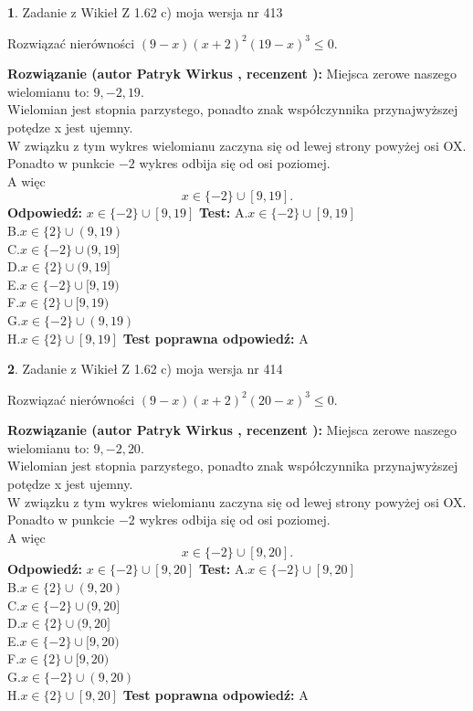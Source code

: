 \documentclass[12pt, a4paper]{article}
\theoremstyle{definition} %
\newtheorem{zad}{}
\newcommand{\zadStart}[1]{\begin{zad}#1\newline}
\newcommand{\zadStop}{\end{zad}}
\newcommand{\rozwStart}[2]{\noindent \textbf{Rozwiązanie (autor #1 , recenzent #2): }\newline}
\newcommand{\rozwStop}{\newline}
\newcommand{\odpStart}{\noindent \textbf{Odpowiedź:}\newline}
\newcommand{\odpStop}{\newline}
\newcommand{\testStart}{\noindent \textbf{Test:}\newline}
\newcommand{\testStop}{\newline}
\newcommand{\kluczStart}{\noindent \textbf{Test poprawna odpowiedź:}\newline}
\newcommand{\kluczStop}{\newline}
\begin{document}
\zadStart{Zadanie z Wikieł Z 1.62 c) moja wersja nr 413}

Rozwiązać nierówności $(9-x)(x+2)^{2}(19-x)^{3}\le0$.
\zadStop
\rozwStart{Patryk Wirkus}{}
Miejsca zerowe naszego wielomianu to: $9, -2, 19$.\\
Wielomian jest stopnia parzystego, ponadto znak współczynnika przy\linebreak najwyższej potędze x jest ujemny.\\ W związku z tym wykres wielomianu zaczyna się od lewej strony powyżej osi OX.\\
Ponadto w punkcie $-2$ wykres odbija się od osi poziomej.\\
A więc $$x \in \{-2\} \cup [9,19].$$
\rozwStop
\odpStart
$x \in \{-2\} \cup [9,19]$
\odpStop
\testStart
A.$x \in \{-2\} \cup [9,19]$\\
B.$x \in \{2\} \cup (9,19)$\\
C.$x \in \{-2\} \cup (9,19]$\\
D.$x \in \{2\} \cup (9,19]$\\
E.$x \in \{-2\} \cup [9,19)$\\
F.$x \in \{2\} \cup [9,19)$\\
G.$x \in \{-2\} \cup (9,19)$\\
H.$x \in \{2\} \cup [9,19]$
\testStop
\kluczStart
A
\kluczStop



\zadStart{Zadanie z Wikieł Z 1.62 c) moja wersja nr 414}

Rozwiązać nierówności $(9-x)(x+2)^{2}(20-x)^{3}\le0$.
\zadStop
\rozwStart{Patryk Wirkus}{}
Miejsca zerowe naszego wielomianu to: $9, -2, 20$.\\
Wielomian jest stopnia parzystego, ponadto znak współczynnika przy\linebreak najwyższej potędze x jest ujemny.\\ W związku z tym wykres wielomianu zaczyna się od lewej strony powyżej osi OX.\\
Ponadto w punkcie $-2$ wykres odbija się od osi poziomej.\\
A więc $$x \in \{-2\} \cup [9,20].$$
\rozwStop
\odpStart
$x \in \{-2\} \cup [9,20]$
\odpStop
\testStart
A.$x \in \{-2\} \cup [9,20]$\\
B.$x \in \{2\} \cup (9,20)$\\
C.$x \in \{-2\} \cup (9,20]$\\
D.$x \in \{2\} \cup (9,20]$\\
E.$x \in \{-2\} \cup [9,20)$\\
F.$x \in \{2\} \cup [9,20)$\\
G.$x \in \{-2\} \cup (9,20)$\\
H.$x \in \{2\} \cup [9,20]$
\testStop
\kluczStart
A
\kluczStop
\end{document}
